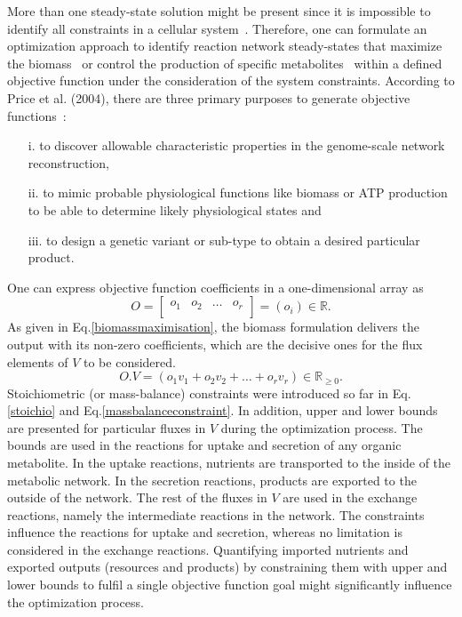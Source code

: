 More than one steady-state solution might be present since it is impossible to identify all constraints in a cellular system~\cite{KAUFFMAN2003491}. Therefore, one can formulate an optimization approach to identify reaction network steady-states that maximize the biomass~\cite{KAUFFMAN2003491,PRICE2004} or control the production of specific metabolites~\cite{VARMA1993} within a defined objective function under the consideration of the system constraints. According to Price et al. (2004),
there are three primary purposes to generate objective functions~\cite{PRICE2004}:
\begin{itemize}
	\item[i.] to discover allowable characteristic properties in the genome-scale network reconstruction,
	\item[ii.] to mimic probable physiological functions like biomass or ATP production to be able to determine likely physiological states and
	\item[iii.] to design a genetic variant or sub-type to obtain a desired particular product.
\end{itemize}

One can express objective function coefficients in a one-dimensional array as
\begin{equation} %
	O =  \begin{bmatrix}
		o_{1} & o_{2} & \dots  & o_{r}\\
	\end{bmatrix}=(o_{i})\in \mathbb{R}.
	\label{objectivecoefficients}
\end{equation}
As given in Eq.\eqref{biomassmaximisation}, the biomass formulation delivers the output with its non-zero coefficients, which are the decisive ones for the flux elements of $V$ to be considered.
\begin{equation} %
	O.V = (o_{1}v_{1} + o_{2}v_{2} + \dots + o_{r}v_{r})\in \mathbb{R}_{\ge0}.
	\label{biomassmaximisation}
\end{equation}
Stoichiometric (or mass-balance) constraints were introduced so far in Eq.\eqref{stoichio} and Eq.\eqref{massbalanceconstraint}. In addition, upper and lower bounds are presented for particular fluxes in $V$ during the optimization process. The bounds are used in the reactions for uptake and secretion of any organic metabolite. In the uptake reactions, nutrients are transported to the inside of the metabolic network. In the secretion reactions, products are exported to the outside of the network. The rest of the fluxes in $V$ are used in the exchange reactions, namely the intermediate reactions in the network. The constraints influence the reactions for uptake and secretion, whereas no limitation is considered in the exchange reactions. Quantifying imported nutrients and exported outputs (resources and products) by constraining them with upper and lower bounds to fulfil a single objective function goal might significantly influence the optimization process.

